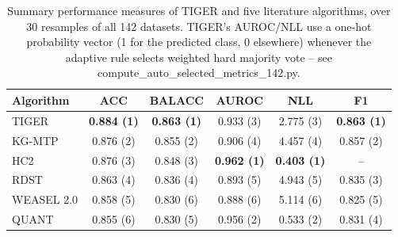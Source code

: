 \begin{table}[t]
\centering
\begin{tabular}{lccccc}
\toprule
Algorithm & ACC & BALACC & AUROC & NLL & F1 \\
\midrule
TIGER & \textbf{0.884 (1)} & \textbf{0.863 (1)} & 0.933 (3) & 2.775 (3) & \textbf{0.863 (1)} \\
KG-MTP & 0.876 (2) & 0.855 (2) & 0.906 (4) & 4.457 (4) & 0.857 (2) \\
HC2 & 0.876 (3) & 0.848 (3) & \textbf{0.962 (1)} & \textbf{0.403 (1)} & -- \\
RDST & 0.863 (4) & 0.836 (4) & 0.893 (5) & 4.943 (5) & 0.835 (3) \\
WEASEL 2.0 & 0.858 (5) & 0.830 (6) & 0.888 (6) & 5.114 (6) & 0.825 (5) \\
QUANT & 0.855 (6) & 0.830 (5) & 0.956 (2) & 0.533 (2) & 0.831 (4) \\
\bottomrule
\end{tabular}
\caption{Summary performance measures of TIGER and five literature algorithms, over 30 resamples of all 142 datasets. TIGER's AUROC/NLL use a one-hot probability vector (1 for the predicted class, 0 elsewhere) whenever the adaptive rule selects weighted hard majority vote -- see compute_auto_selected_metrics_142.py.}
\label{tab:multi_metric_142}
\end{table}